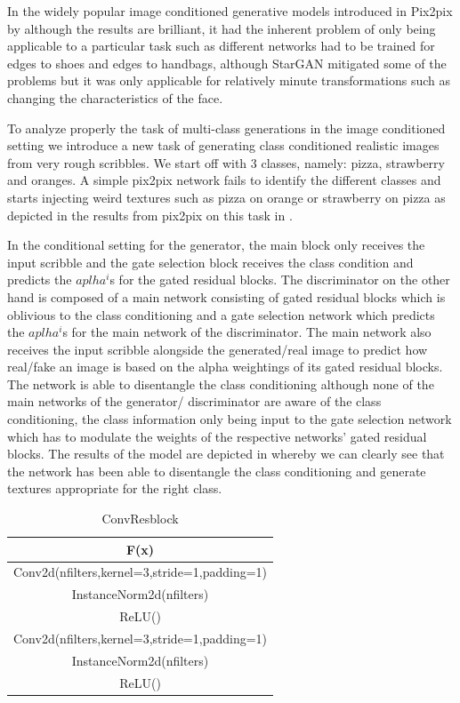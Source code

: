 In the widely popular image conditioned generative models introduced in Pix2pix by \cite{isola2016image2image} although the results are brilliant, it had the inherent problem of only being applicable to a particular task such as different networks had to be trained for edges to shoes and edges to handbags, although StarGAN \cite{choi2017stargan} mitigated some of the problems but it was only applicable for relatively minute transformations such as changing the characteristics of the face.

To analyze properly the task of multi-class generations in the image conditioned setting we introduce a new task of generating class conditioned realistic images from very rough scribbles. We start off with 3 classes, namely: pizza, strawberry and oranges. A simple pix2pix network fails to identify the different classes and starts injecting weird textures such as pizza on orange or strawberry on pizza as depicted in the results from pix2pix on this task in . 

In the conditional setting for the generator, the main block only receives the input scribble and the gate selection block receives the class condition and predicts the $aplha^i$s for the gated residual blocks. The discriminator on the other hand is composed of a main network consisting of gated residual blocks which is oblivious to the class conditioning and a gate selection network which predicts the $aplha^i$s for the main network of the discriminator. The main network also receives the input scribble alongside the generated/real image to predict how real/fake an image is based on the alpha weightings of its gated residual blocks. The network is able to disentangle the class conditioning although none of the main networks of the generator/ discriminator are aware of the class conditioning, the class information only being input to the gate selection network which has to modulate the weights of the respective networks' gated residual blocks. The results of the model are depicted in  whereby we can clearly see that the network has been able to disentangle the class conditioning and generate textures appropriate for the right class.

\begin{table}[ht]
\caption{ConvResblock} %
\centering %
\begin{tabular}{c} %
\hline\hline %
F(x)\\%
\hline
Conv2d(nfilters,kernel=3,stride=1,padding=1) \\
InstanceNorm2d(nfilters)\\ %
ReLU() \\
Conv2d(nfilters,kernel=3,stride=1,padding=1) \\
InstanceNorm2d(nfilters)\\ %
ReLU() \\
\hline %
\end{tabular}
\label{table:convresblock} %
\end{table}


